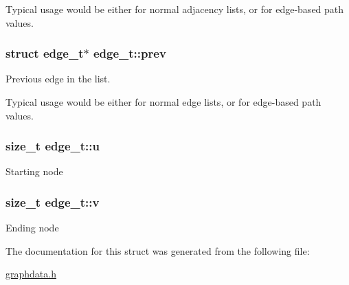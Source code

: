 Typical usage would be either for normal adjacency lists, or for edge-\/based path values. 
\subsubsection[{\texorpdfstring{prev}{prev}}]{\setlength{\rightskip}{0pt plus 5cm}struct {\bf edge\+\_\+t}$\ast$ edge\+\_\+t\+::prev}\hypertarget{structedge__t_ad68c87997feb8fdf8f38703a275b3b29}{}\label{structedge__t_ad68c87997feb8fdf8f38703a275b3b29}


Previous edge in the list. 

Typical usage would be either for normal edge lists, or for edge-\/based path values. 
\subsubsection[{\texorpdfstring{u}{u}}]{\setlength{\rightskip}{0pt plus 5cm}size\+\_\+t edge\+\_\+t\+::u}\hypertarget{structedge__t_a2bd21781f62242a78e70595ea781769c}{}\label{structedge__t_a2bd21781f62242a78e70595ea781769c}
Starting node 
\subsubsection[{\texorpdfstring{v}{v}}]{\setlength{\rightskip}{0pt plus 5cm}size\+\_\+t edge\+\_\+t\+::v}\hypertarget{structedge__t_a23bf912e6f3c953e2f8577ab7c692e85}{}\label{structedge__t_a23bf912e6f3c953e2f8577ab7c692e85}
Ending node 

The documentation for this struct was generated from the following file\+:\begin{DoxyCompactItemize}
\item 
\hyperlink{graphdata_8h}{graphdata.\+h}\end{DoxyCompactItemize}
